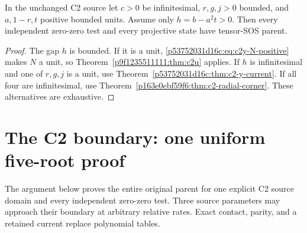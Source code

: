 \begin{corollary}
\label{p163e0ebf59f6:cor:c2-bounded-shape}
In the unchanged C2 source let $c>0$ be infinitesimal, $r,g,j>0$
bounded, and $a,1-r,t$ positive bounded units.  Assume only
$h=b-a^2t>0$.  Then every independent zero-zero test and every projective
state have tensor-SOS parent.
\end{corollary}
\begin{proof}
The gap $h$ is bounded.  If it is a unit,
\eqref{p53752031d16c:eq:c2y-N-positive} makes $N$ a unit, so Theorem~\ref{p9f1235511111:thm:c2u}
applies.  If $h$ is infinitesimal and one of $r,g,j$ is a unit, use
Theorem~\ref{p53752031d16c:thm:c2-y-current}.  If all four are infinitesimal, use
Theorem~\ref{p163e0ebf59f6:thm:c2-radial-corner}.  These alternatives are exhaustive.
\end{proof}


\section{\texorpdfstring{The C2 boundary: one uniform five-root proof}{The C2 boundary: one uniform five-root proof}}
\label{component:p9f1235511111}

\label{p9f1235511111:sec:c2-unified}

The argument below proves the entire original parent for one explicit
C2 source domain and every independent zero-zero test.  Three source
parameters may approach their boundary at arbitrary relative rates.
Exact contact, parity, and a retained current replace polynomial tables.

